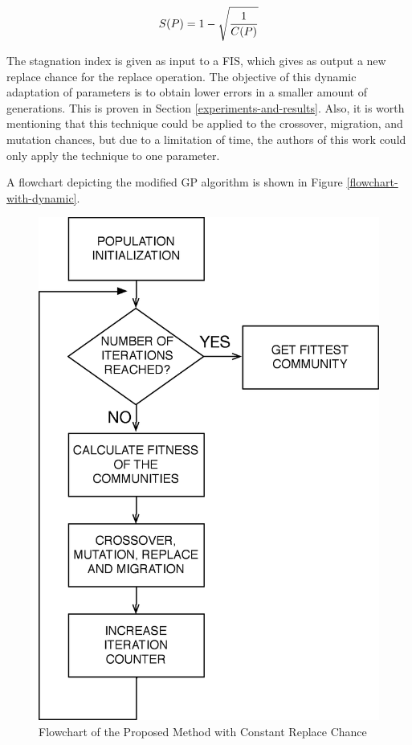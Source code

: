 \documentclass[12pt,journal,compsoc]{IEEEtran}
\begin{document}
\begin{equation} \label{si}
S(P) = 1 - \sqrt{1 \over C(P)}
\end{equation}

The stagnation index is given as input to a FIS, which gives as output a new replace chance for the replace operation. The objective of this dynamic adaptation of parameters is to obtain lower errors in a smaller amount of generations. This is proven in Section \ref{experiments-and-results}. Also, it is worth mentioning that this technique could be applied to the crossover, migration, and mutation chances, but due to a limitation of time, the authors of this work could only apply the technique to one parameter.

A flowchart depicting the modified GP algorithm is shown in Figure \ref{flowchart-with-dynamic}.

\begin{figure}[h!]
\begin{center}
\includegraphics[width=0.70\columnwidth]{figures/flowchart-without/flowchart-without}
\caption{{\label{flowchart-without-dynamic}Flowchart of the Proposed Method with Constant Replace Chance%
}}
\end{center}
\end{figure}
\end{document}
